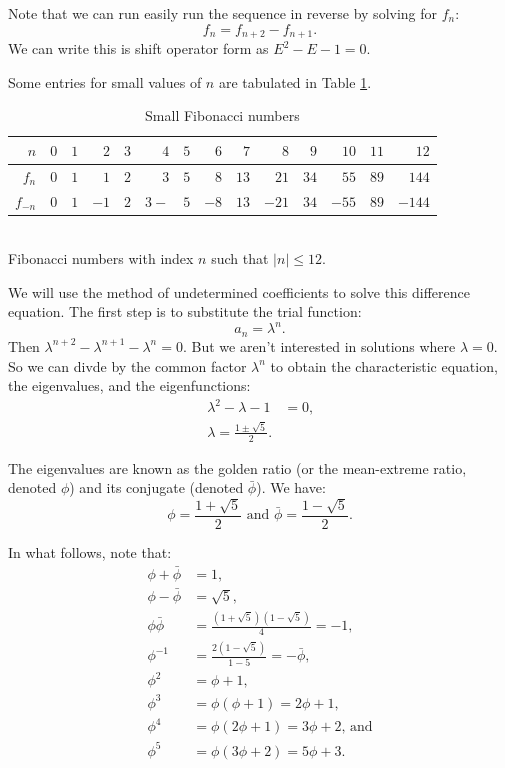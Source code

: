 \documentclass[12pt,letterpaper,reqno]{amsart}
\numberwithin{equation}{section}
\numberwithin{theorem}{section}
\numberwithin{table}{section}
\begin{document}
Note that we can run easily run the sequence in reverse by solving for $f_n$:
\[
	f_n = f_{n+2} - f_{n+1}
	\text{.}
\]
We can write this is shift operator form as $E^2-E-1=0$.

Some entries for small values of $n$ are tabulated in Table \ref{tbl:Fibo}.

\begin{table}[ht]
	\begin{center}
	\begin{tabular}{r|rrrrrrrrrrrrr}
		$n$ 		& $0$ 	& $1$ 	& $2$ 	& $3$ 	& $4$ 	& $5$ 	& $6$
					& $7$ 	& $8$ 	& $9$ 	& $10$ 	& $11$ 	& $12$ \\
		\hline
		$f_n$ 		& $0$ 	& $1$ 	& $1$ 	& $2$ 	& $3$ 	& $5$ 	& $8$
					& $13$ 	& $21$	& $34$	& $55$	& $89$	& $144$ \\
		$f_{-n}$ 	& $0$ 	& $1$ 	& $-1$ 	& $2$ 	& $3-$ 	& $5$ 	& $-8$
					& $13$ 	& $-21$	& $34$	& $-55$	& $89$	& $-144$ \\
	\end{tabular} \\
	Fibonacci numbers with index $n$ such that $|n| \leq 12$. 
	\end{center}
	\caption{Small Fibonacci numbers} \label{tbl:Fibo}
\end{table}

We will use the method of undetermined coefficients to solve this difference equation.  The first step is
to substitute the trial function:
\[
	a_n = \lambda^n
	\text{.}
\]
Then $\lambda^{n+2} - \lambda^{n+1} - \lambda^n = 0$.  But we aren't interested in solutions where $\lambda=0$.  So we can divde by the common factor $\lambda^n$ to obtain the characteristic equation, the eigenvalues, and the eigenfunctions:
\begin{align*}
	\lambda^2 - \lambda - 1 &= 0 \text{,} \\
		\lambda = \frac{1\pm\sqrt{5}}{2} \text{.}
\end{align*}

The eigenvalues are known as the golden ratio (or the mean-extreme ratio, denoted $\phi$) and its conjugate (denoted $\bar{\phi}$).  We have:
\[
	\phi = \frac{1+\sqrt{5}}{2}
	\text{ and }
	\bar{\phi} = \frac{1-\sqrt{5}}{2}
	\text{.}
\]

In what follows, note that:
\begin{align*}
	\phi + \bar{\phi} &= 1 \text{,} \\
	\phi - \bar{\phi} &= \sqrt{5} \text{,} \\
	\phi \bar{\phi} &= \frac{(1+\sqrt{5})(1-\sqrt{5})}{4} = -1 \text{,} \\
	\phi^{-1} &= \frac{2(1-\sqrt{5})}{1-5} = -\bar{\phi} \text{,} \\
	\phi^2 &= \phi + 1 \text{,} \\
	\phi^3 &= \phi(\phi + 1) = 2\phi + 1 \text{,} \\
	\phi^4 &= \phi(2\phi + 1) = 3\phi + 2 \text{, and} \\
	\phi^5 &= \phi(3\phi + 2) = 5\phi + 3 \text{.}
\end{align*}
\end{document}
